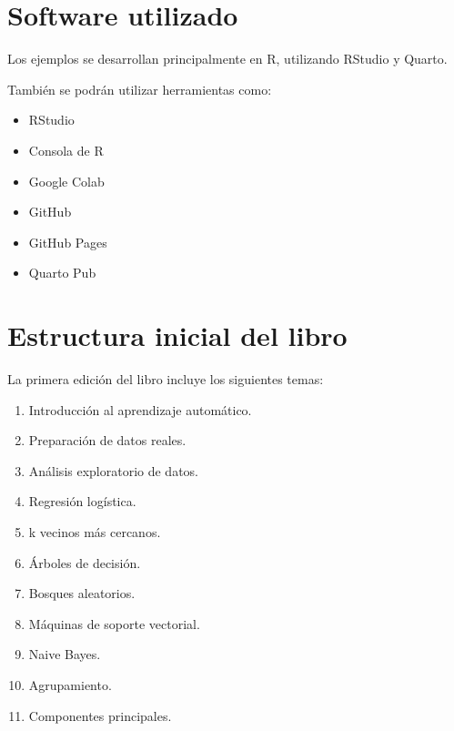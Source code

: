 \documentclass[
  11pt,
  letterpaper,
]{book}
\providecommand{\tightlist}{%
  \setlength{\itemsep}{0pt}\setlength{\parskip}{0pt}}
\begin{document}
\section*{Software utilizado}\label{software-utilizado}


Los ejemplos se desarrollan principalmente en R, utilizando RStudio y
Quarto.

También se podrán utilizar herramientas como:

\begin{itemize}
\tightlist
\item
  RStudio
\item
  Consola de R
\item
  Google Colab
\item
  GitHub
\item
  GitHub Pages
\item
  Quarto Pub
\end{itemize}

\section*{Estructura inicial del
libro}\label{estructura-inicial-del-libro}


La primera edición del libro incluye los siguientes temas:

\begin{enumerate}
\def\labelenumi{\arabic{enumi}.}
\tightlist
\item
  Introducción al aprendizaje automático.
\item
  Preparación de datos reales.
\item
  Análisis exploratorio de datos.
\item
  Regresión logística.
\item
  k vecinos más cercanos.
\item
  Árboles de decisión.
\item
  Bosques aleatorios.
\item
  Máquinas de soporte vectorial.
\item
  Naive Bayes.
\item
  Agrupamiento.
\item
  Componentes principales.
\end{enumerate}
\end{document}
